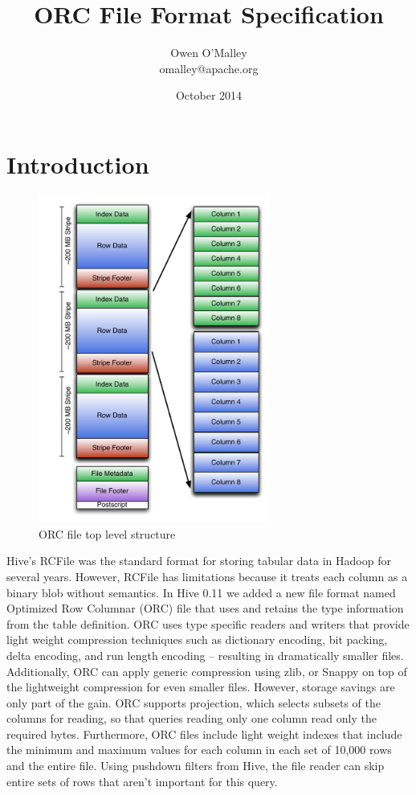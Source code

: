 \documentclass{article}
\title{ORC File Format Specification}
\author{Owen O'Malley\\omalley@apache.org}
\date{October 2014}
\begin{document}
\maketitle

\section{Introduction}

\begin{figure}
  \centering
  \includegraphics[width=3in]{ORCFileStructure.pdf}
  \caption{ORC file top level structure}
  \label{orc-structure}
  \vspace{-20pt}
\end{figure}

Hive's RCFile was the standard format for storing tabular data in
Hadoop for several years. However, RCFile has limitations because it
treats each column as a binary blob without semantics. In Hive 0.11 we
added a new file format named Optimized Row Columnar (ORC) file that
uses and retains the type information from the table definition. ORC
uses type specific readers and writers that provide light weight
compression techniques such as dictionary encoding, bit packing, delta
encoding, and run length encoding -- resulting in dramatically smaller
files. Additionally, ORC can apply generic compression using zlib, or
Snappy on top of the lightweight compression for even smaller
files. However, storage savings are only part of the gain. ORC
supports projection, which selects subsets of the columns for reading,
so that queries reading only one column read only the required
bytes. Furthermore, ORC files include light weight indexes that
include the minimum and maximum values for each column in each set of
10,000 rows and the entire file. Using pushdown filters from Hive, the
file reader can skip entire sets of rows that aren't important for
this query.
\end{document}
